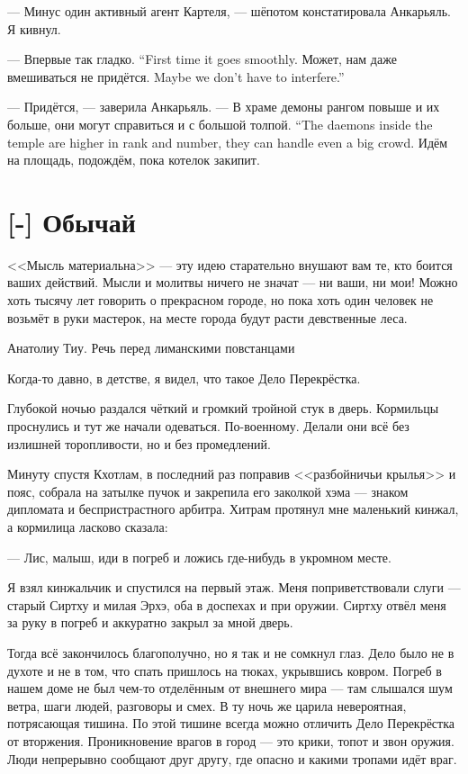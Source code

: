 --- Минус один активный агент Картеля, --- шёпотом констатировала Анкарьяль.
Я кивнул.

{--- Впервые так гладко.}
{``First time it goes smoothly.}
{Может, нам даже вмешиваться не придётся.}
{Maybe we don't have to interfere.''}

--- Придётся, --- заверила Анкарьяль.
{--- В храме демоны рангом повыше и их больше, они могут справиться и с большой толпой.}
{``The daemons inside the temple are higher in rank and number, they can handle even a big crowd.}
Идём на площадь, подождём, пока котелок закипит.

\section{[-] Обычай}

\epigraph
{<<Мысль материальна>> --- эту идею старательно внушают вам те, кто боится ваших действий.
Мысли и молитвы ничего не значат --- ни ваши, ни мои!
Можно хоть тысячу лет говорить о прекрасном городе, но пока хоть один человек не возьмёт в руки мастерок, на месте города будут расти девственные леса.}
{Анатолиу Тиу.
Речь перед лиманскими повстанцами}

Когда-то давно, в детстве, я видел, что такое Дело Перекрёстка.

Глубокой ночью раздался чёткий и громкий тройной стук в дверь.
Кормильцы проснулись и тут же начали одеваться.
По-военному.
Делали они всё без излишней торопливости, но и без промедлений.

Минуту спустя Кхотлам, в последний раз поправив <<разбойничьи крылья>> и пояс, собрала на затылке пучок и закрепила его заколкой хэма --- знаком дипломата и беспристрастного арбитра.
Хитрам протянул мне маленький кинжал, а кормилица ласково сказала:

--- Лис, малыш, иди в погреб и ложись где-нибудь в укромном месте.

Я взял кинжальчик и спустился на первый этаж.
Меня поприветствовали слуги --- старый Сиртху и милая Эрхэ, оба в доспехах и при оружии.
Сиртху отвёл меня за руку в погреб и аккуратно закрыл за мной дверь.

Тогда всё закончилось благополучно, но я так и не сомкнул глаз.
Дело было не в духоте и не в том, что спать пришлось на тюках, укрывшись ковром.
Погреб в нашем доме не был чем-то отделённым от внешнего мира --- там слышался шум ветра, шаги людей, разговоры и смех.
В ту ночь же царила невероятная, потрясающая тишина.
По этой тишине всегда можно отличить Дело Перекрёстка от вторжения.
Проникновение врагов в город --- это крики, топот и звон оружия.
Люди непрерывно сообщают друг другу, где опасно и какими тропами идёт враг.

